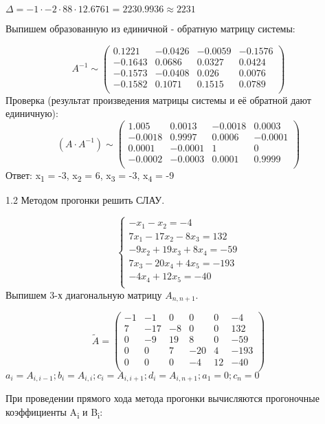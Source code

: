 \documentclass[10pt, a4paper]{scrartcl}
\begin{document}
\(\Delta = -1 \cdot -2 \cdot 88 \cdot 12.6761 = 2230.9936 \approx 2231\)

Выпишем образованную из единичной - обратную матрицу системы:

\[A^{-1} \sim \begin{pmatrix} 
0.1221 & -0.0426 & -0.0059 & -0.1576\\
-0.1643 & 0.0686 & 0.0327 & 0.0424\\
-0.1573 & -0.0408 & 0.026 & 0.0076\\
-0.1582 & 0.1071 & 0.1515 & 0.0789\\
\end{pmatrix}\] Проверка (результат произведения матрицы системы и её
обратной дают единичную): \[(A \cdot A^{-1}) \sim \begin{pmatrix} 
1.005 & 0.0013 & -0.0018 & 0.0003\\
-0.0018 & 0.9997 & 0.0006 & -0.0001\\
0.0001 & -0.0001 & 1 & 0\\
-0.0002 & -0.0003 & 0.0001 & 0.9999\\
\end{pmatrix}\] Ответ: x\textsubscript{1} = -3, x\textsubscript{2} = 6,
x\textsubscript{3} = -3, x\textsubscript{4} = -9

\pagebreak

1.2 Методом прогонки решить СЛАУ.

\[\begin{cases}
-x_1 - x_2 = -4\\
7x_1 - 17x_2 - 8x_3 = 132\\
-9x_2 + 19x_3 + 8x_4 = -59\\
7x_3 - 20x_4 + 4x_5 = -193\\
-4x_4 + 12x_5 = -40\\
\end{cases}\] Выпишем 3-х диагональную матрицу \(A_{n,n+1}\).

\[\widetilde{A} = \begin{pmatrix} 
-1 & -1 & 0 & 0 & 0 & -4\\
7 & -17 & -8 & 0 & 0 & 132\\
0 & -9 & 19 & 8 & 0 & -59\\
0 & 0 & 7 & -20 & 4 & -193\\
0 & 0 & 0 & -4 & 12 & -40\\
\end{pmatrix}\]
\(\displaystyle a_i = A_{i, i-1}; b_i = A_{i, i}; c_i = A_{i, i+1}; d_i = A_{i,n+1}; a_1 = 0; c_n = 0\)

При проведении прямого хода метода прогонки вычисляются прогоночные
коэффициенты A\textsubscript{i} и B\textsubscript{i}:
\end{document}
